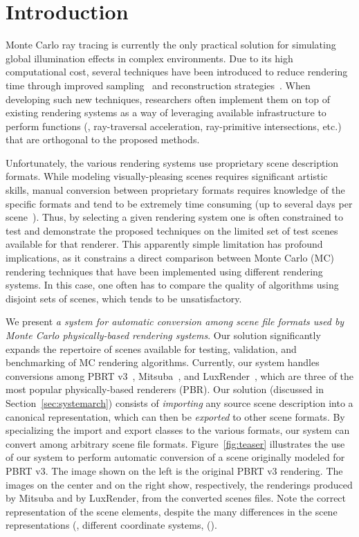 \section{Introduction}
\label{sec:introduction}

Monte Carlo ray tracing is currently the only practical solution for simulating global illumination effects in complex environments.
Due to its high computational cost, several techniques have been introduced to reduce rendering time through improved sampling~\cite{Heck2013} and reconstruction strategies~\cite{Sen2012, Rousselle2013, Kalantari2015, Bitterli2016}. When developing such new techniques, researchers often implement them on top of existing rendering systems as a way of leveraging available infrastructure to perform functions (\eg, ray-traversal acceleration, ray-primitive intersections, etc.) that are orthogonal to the proposed methods.

Unfortunately, the various rendering systems use proprietary scene description formats. While modeling visually-pleasing scenes requires significant artistic skills, manual conversion between proprietary formats requires knowledge of the specific formats and tend to be extremely time consuming (up to several days per scene~\cite{tungsten}). 
Thus, by selecting a given rendering system one is often constrained to test and demonstrate the proposed techniques on the limited set of test scenes available for that renderer. This apparently simple limitation has profound implications, as it constrains a direct comparison between Monte Carlo (MC) rendering techniques that have been implemented using different rendering systems. In this case, one often has to compare the quality of algorithms using disjoint sets of scenes, which tends to be unsatisfactory.    
    
We present {\it a system for automatic conversion among scene file formats used by Monte Carlo physically-based rendering systems}. 
Our solution significantly expands the repertoire of scenes available for testing, validation, and benchmarking of MC rendering algorithms.  
Currently, our system handles conversions among PBRT v3~\cite{PBRT:v3}, Mitsuba~\cite{mitsuba}, and LuxRender~\cite{luxrender}, which are three of the most popular physically-based renderers (PBR). Our solution (discussed in Section~\ref{sec:systemarch}) consists of {\it importing} any source scene description into a canonical representation, which can then be {\it exported} to other scene formats. By specializing the import and export classes to the various formats, our system can convert among arbitrary scene file formats.     
%
Figure~\ref{fig:teaser} illustrates the use of our system to perform automatic conversion of a scene originally modeled for PBRT v3. The image shown on the left is the original PBRT v3 rendering. The images on the center and on the right show, respectively, the renderings produced by Mitsuba and by LuxRender, from the converted scenes files. Note the correct representation of the scene elements, despite the many differences in the scene representations (\eg, different coordinate systems, ().

